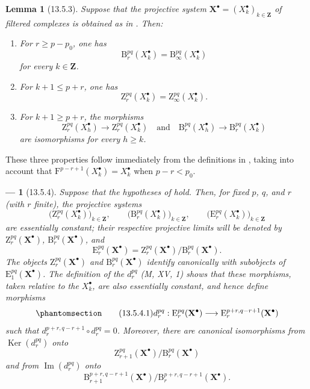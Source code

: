 \documentclass[oneside]{amsart}
\theoremstyle{ega-env-style}
\newtheorem*{env}{---}
\theoremstyle{ega-thm-env-style}
\newtheorem*{lemma}{Lemma}
\theoremstyle{ega-defn-env-style}
\def\bb{\mathbf}                    %
\def\leq{\leqslant}                 %
\def\geq{\geqslant}                 %
\def\Ker{\operatorname{Ker}}
\def\Im{\operatorname{Im}}
\newcommand{\oldpage}[2][]{{\marginnote{\normalfont{\textbf{#1}~|~#2}}}\ignorespaces}
\let\EGAOriginalLabel\label
\renewcommand{\label}[1]{\phantomsection\EGAOriginalLabel{#1}}
\begin{document}
\begin{lemma}[13.5.3]
\label{0.13.5.3}
Suppose that the projective system
$\bb{X}^\bullet=(X^\bullet_k)_{k\in\bb{Z}}$ of filtered complexes is
obtained as in . Then:
\begin{enumerate}
  \item[{\rm a)}] For $r\geq p-p_0$, one has
  \[
    \mathrm{B}_r^{pq}(X^\bullet_k)
    =
    \mathrm{B}_\infty^{pq}(X^\bullet_k)
  \]
  for every $k\in\bb{Z}$.
  \item[{\rm b)}] For $k+1\leq p+r$, one has
  \[
    \mathrm{Z}_r^{pq}(X^\bullet_k)
    =
    \mathrm{Z}_\infty^{pq}(X^\bullet_k).
  \]
  \item[{\rm c)}] For $k+1\geq p+r$, the morphisms
  \[
    \mathrm{Z}_r^{pq}(X^\bullet_h)
    \longrightarrow
    \mathrm{Z}_r^{pq}(X^\bullet_k)
    \quad\text{and}\quad
    \mathrm{B}_r^{pq}(X^\bullet_h)
    \longrightarrow
    \mathrm{B}_r^{pq}(X^\bullet_k)
  \]
  are isomorphisms for every $h\geq k$.
\end{enumerate}
\end{lemma}

\oldpage[0\textsubscript{III}]{72}
These three properties follow immediately from the definitions in
, taking into account that
$\mathrm{F}^{p-r+1}(X^\bullet_k)=X^\bullet_k$ when $p-r<p_0$.

\begin{env}[13.5.4]
\label{0.13.5.4}
Suppose that the hypotheses of  hold.
Then, for fixed $p$, $q$, and $r$ (with $r$ finite), the projective
systems
\[
  \bigl(\mathrm{Z}_r^{pq}(X^\bullet_k)\bigr)_{k\in\bb{Z}},
  \qquad
  \bigl(\mathrm{B}_r^{pq}(X^\bullet_k)\bigr)_{k\in\bb{Z}},
  \qquad
  \bigl(\mathrm{E}_r^{pq}(X^\bullet_k)\bigr)_{k\in\bb{Z}}
\]
are \emph{essentially constant}; their respective projective limits
will be denoted by
$\mathrm{Z}_r^{pq}(\bb{X}^\bullet)$,
$\mathrm{B}_r^{pq}(\bb{X}^\bullet)$, and
\[
  \mathrm{E}_r^{pq}(\bb{X}^\bullet)
  =
  \mathrm{Z}_r^{pq}(\bb{X}^\bullet)/
  \mathrm{B}_r^{pq}(\bb{X}^\bullet).
\]
The objects $\mathrm{Z}_r^{pq}(\bb{X}^\bullet)$ and
$\mathrm{B}_r^{pq}(\bb{X}^\bullet)$ identify canonically with
subobjects of $\mathrm{E}_1^{pq}(\bb{X}^\bullet)$.
The definition of the $d_r^{pq}$ (M, XV, 1) shows that these
morphisms, taken relative to the $X^\bullet_k$, are also essentially
constant, and hence define morphisms
\begin{equation}
\label{0.13.5.4.1}
\tag{13.5.4.1}
  d_r^{pq}:
  \mathrm{E}_r^{pq}(\bb{X}^\bullet)
  \longrightarrow
  \mathrm{E}_r^{p+r,q-r+1}(\bb{X}^\bullet)
\end{equation}
such that
$d_r^{p+r,q-r+1}\circ d_r^{pq}=0$.
Moreover, there are canonical isomorphisms from
$\Ker(d_r^{pq})$ onto
\[
  \mathrm{Z}_{r+1}^{pq}(\bb{X}^\bullet)/
  \mathrm{B}_r^{pq}(\bb{X}^\bullet)
\]
and from $\Im(d_r^{pq})$ onto
\[
  \mathrm{B}_{r+1}^{p+r,q-r+1}(\bb{X}^\bullet)/
  \mathrm{B}_r^{p+r,q-r+1}(\bb{X}^\bullet).
\]
\end{env}
\end{document}
